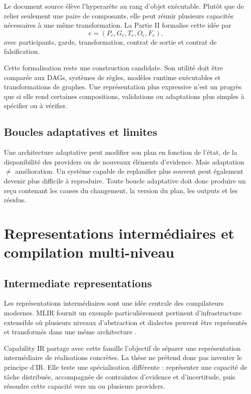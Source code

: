 Le document source élève l'hyperarête au rang d'objet exécutable. Plutôt que de relier seulement une paire de composants, elle peut réunir plusieurs capacités nécessaires à une même transformation. La Partie II formalise cette idée par
\[
e=(P_e,G_e,T_e,O_e,F_e),
\]
avec participants, garde, transformation, contrat de sortie et contrat de falsification.

Cette formalisation reste une construction candidate. Son utilité doit être comparée aux DAGs, systèmes de règles, modèles runtime exécutables et transformations de graphes. Une représentation plus expressive n'est un progrès que si elle rend certaines compositions, validations ou adaptations plus simples à spécifier ou à vérifier.

\section{Boucles adaptatives et limites}

Une architecture adaptative peut modifier son plan en fonction de l'état, de la disponibilité des providers ou de nouveaux éléments d'evidence. Mais adaptation $\neq$ amélioration. Un système capable de replanifier plus souvent peut également devenir plus difficile à reproduire. Toute boucle adaptative doit donc produire un reçu contenant les causes du changement, la version du plan, les outputs et les résidus.

\chapter{Representations intermédiaires et compilation multi-niveau}

\section{Intermediate representations}

Les représentations intermédiaires sont une idée centrale des compilateurs modernes. MLIR fournit un exemple particulièrement pertinent d'infrastructure extensible où plusieurs niveaux d'abstraction et dialectes peuvent être représentés et transformés dans une même architecture \cite{lattner2020mlir}.

Capability IR partage avec cette famille l'objectif de séparer une représentation intermédiaire de réalisations concrètes. La thèse ne prétend donc pas inventer le principe d'IR. Elle teste une spécialisation différente : représenter une capacité de tâche distribuée, accompagnée de contraintes d'evidence et d'incertitude, puis résoudre cette capacité vers un ou plusieurs providers.

